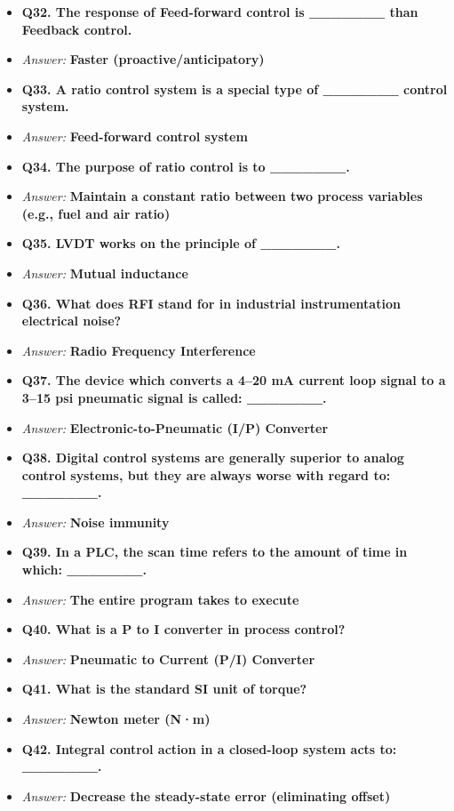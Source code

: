\begin{itemize}
  \item \textbf{Q32. The response of Feed-forward control is \_\_\_\_\_\_\_ than Feedback control.}
  \item \textit{Answer:} \textbf{Faster (proactive/anticipatory)}
  \item \textbf{Q33. A ratio control system is a special type of \_\_\_\_\_\_\_ control system.}
  \item \textit{Answer:} \textbf{Feed-forward control system}
  \item \textbf{Q34. The purpose of ratio control is to \_\_\_\_\_\_\_.}
  \item \textit{Answer:} \textbf{Maintain a constant ratio between two process variables (e.g., fuel and air ratio)}
  \item \textbf{Q35. LVDT works on the principle of \_\_\_\_\_\_\_.}
  \item \textit{Answer:} \textbf{Mutual inductance}
  \item \textbf{Q36. What does RFI stand for in industrial instrumentation electrical noise?}
  \item \textit{Answer:} \textbf{Radio Frequency Interference}
  \item \textbf{Q37. The device which converts a 4–20 mA current loop signal to a 3–15 psi pneumatic signal is called: \_\_\_\_\_\_\_.}
  \item \textit{Answer:} \textbf{Electronic-to-Pneumatic (I/P) Converter}
  \item \textbf{Q38. Digital control systems are generally superior to analog control systems, but they are always worse with regard to: \_\_\_\_\_\_\_.}
  \item \textit{Answer:} \textbf{Noise immunity}
  \item \textbf{Q39. In a PLC, the scan time refers to the amount of time in which: \_\_\_\_\_\_\_.}
  \item \textit{Answer:} \textbf{The entire program takes to execute}
  \item \textbf{Q40. What is a P to I converter in process control?}
  \item \textit{Answer:} \textbf{Pneumatic to Current (P/I) Converter}
  \item \textbf{Q41. What is the standard SI unit of torque?}
  \item \textit{Answer:} \textbf{Newton meter (N·m)}
  \item \textbf{Q42. Integral control action in a closed-loop system acts to: \_\_\_\_\_\_\_.}
  \item \textit{Answer:} \textbf{Decrease the steady-state error (eliminating offset)}

\end{itemize}

